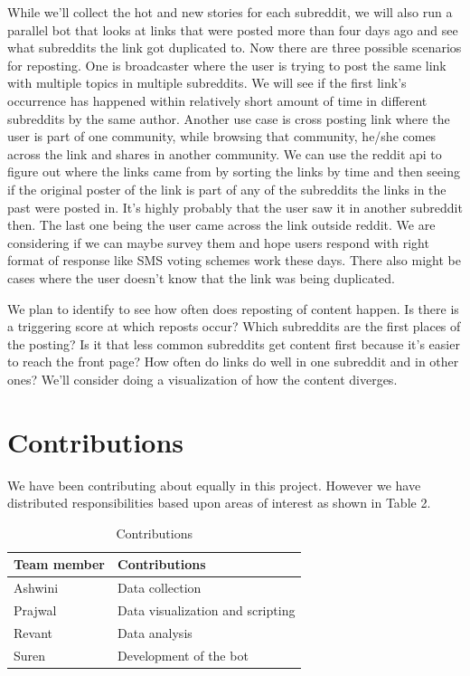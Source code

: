 \documentclass{article} %
\begin{document}
While we'll collect the hot and new stories for each subreddit, we will also run a parallel bot that looks at links that were posted more than four days ago and see what subreddits the link got duplicated to. Now there are three possible scenarios for reposting. One is broadcaster where the user is trying to post the same link with multiple topics in multiple subreddits. We will see if the first link's occurrence has happened within relatively short amount of time in different subreddits by the same author. Another use case is cross posting link where the user is part of one community, while browsing that community, he/she comes across the link and shares in another community. We can use the reddit api to figure out where the links came from by sorting the links by time and then seeing if the original poster of the link is part of any of the subreddits the links in the past were posted in. It's highly probably that the user saw it in another subreddit then. The last one being the user came across the link outside reddit. We are considering if we can maybe survey them and hope users respond with right format of response like SMS voting schemes work these days. There also might be cases where the user doesn't know that the link was being duplicated. 

We plan to identify to see how often does reposting of content happen. Is there is a triggering score at which reposts occur? Which subreddits are the first places of the posting? Is it that less common subreddits get content first because it's easier to reach the front page? How often do links do well in one subreddit and in other ones? We'll consider doing a visualization of how the content diverges.
\fi


\section{Contributions}
We have been contributing about equally in this project. However we have distributed responsibilities based upon areas of interest as shown in Table 2.


\begin{table}
\begin{center}
    \begin{tabular}{ | l | l | }
    \hline
    Team member & Contributions \\ \hline
    Ashwini & Data collection \\ \hline
    Prajwal & Data visualization and scripting \\ \hline
    Revant & Data analysis \\ \hline
    Suren & Development of the bot \\ 
    \hline
    \end{tabular}
    \caption{Contributions}
    \end{center}
    \end{table}
\end{document}
